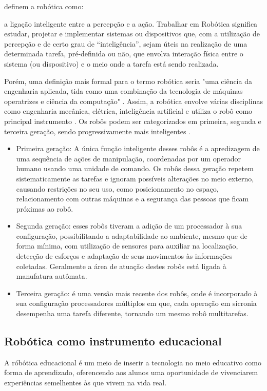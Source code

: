 \cite{de2006robotica} definem a robótica como: 
\begin{citacao}
a ligação inteligente entre a percepção e a ação. Trabalhar em Robótica significa estudar, projetar e implementar sistemas ou dispositivos que, com a utilização de percepção e de certo grau de “inteligência”, sejam úteis na realização de uma determinada tarefa, pré-definida ou não, que envolva interação física entre o sistema (ou dispositivo) e o meio onde a tarefa está sendo realizada.
\end{citacao}
Porém, uma definição mais formal para o termo robótica seria "uma ciência da engenharia aplicada, tida como uma combinação da tecnologia de máquinas operatrizes e ciência da computação" . Assim, a robótica envolve várias disciplinas como engenharia mecânica, elétrica, inteligência artificial e utiliza o robô como principal instrumento \cite{curcio2008instituto}.
Os robôs podem ser categorizados em primeira, segunda e terceira geração, sendo progressivamente mais inteligentes .
\begin{itemize}
\item Primeira geração: A única função inteligente desses robôs é a apredizagem de uma sequência de ações de manipulação, coordenadas por um operador humano usando uma unidade de comando. Os robôs dessa geração repetem sistematicamente as tarefas e ignoram possíveis alterações no meio externo, causando restrições no seu uso, como posicionamento no espaço, relacionamento com outras máquinas e a segurança das pessoas que ficam próximas ao robô. 
\item Segunda geração: esses robôs tiveram a adição de um processador à sua configuração, possibilitando a adaptabilidade ao ambiente, mesmo que de forma mínima, com utilização de sensores para auxiliar na localização, detecção de esforços e adaptação de seus movimentos às informações coletadas. Geralmente a área de atuação destes robôs está ligada à manufatura autômata.
\item Terceira geração: é uma versão mais recente dos robôs, onde é incorporado à sua configuração processadores múltiplos em que, cada operação em sicronia desempenha uma tarefa diferente, tornando um mesmo robô multitarefas.	 
\end{itemize}

\subsection{Robótica como instrumento educacional}
A róbótica educacional é um meio de inserir a tecnologia no meio educativo como forma de aprendizado, oferencendo aos alunos uma oportunidade de vivenciarem experiências semelhentes às que vivem na vida real.
